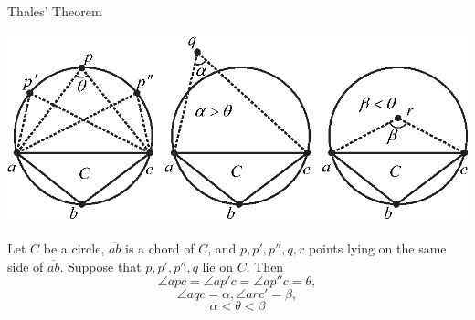 \documentclass[10pt]{beamer}
\begin{document}
\begin{frame}{Thales' Theorem}

	\includegraphics[width=\linewidth]{img/ThalesTheorem.eps}
	
	Let $C$ be a circle, $\overline{ab}$ is a chord of $C$, and
	$p,p',p'',q, r$ points lying on the same side of $\overline{ab}$.
	Suppose that $p,p',p'', q$ lie on $C$. Then
	$$
		\angle apc = \angle ap'c = \angle ap''c = \theta,
	$$ 
	$$
		\angle aqc = \alpha, \angle arc' = \beta,
	$$
	$$	
		\alpha < \theta < \beta
	$$
\end{frame}
\end{document}
